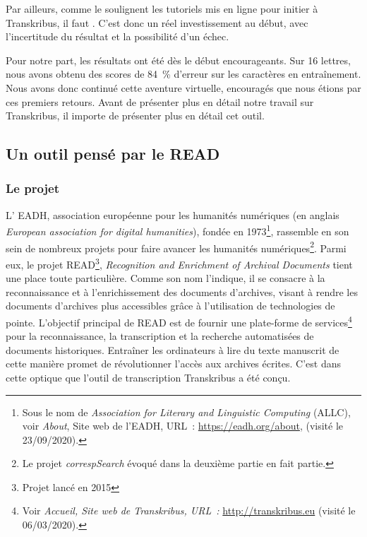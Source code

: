 Par ailleurs, comme le soulignent les tutoriels mis en ligne pour initier à Transkribus, il faut . C’est donc un réel investissement au début, avec l’incertitude du résultat et la possibilité d’un échec.

Pour notre part, les résultats ont été dès le début encourageants. Sur 16 lettres, nous avons obtenu des scores de 84~\% d'erreur sur les caractères en entraînement. 
Nous avons donc continué cette aventure virtuelle, encouragés que nous étions par ces premiers retours.
Avant de présenter plus en détail notre travail sur Transkribus, il importe de présenter plus en détail cet outil.

\subsection{Un outil pensé par le READ}

\subsubsection{Le projet}

L' EADH, association européenne pour les humanités numériques (en anglais \emph{European association for digital humanities}), fondée en 1973\footnote{Sous le nom de \emph{Association for Literary and Linguistic Computing} (ALLC), voir \emph{About}, Site web de l'EADH, URL~: \url{https://eadh.org/about}, (visité le 23/09/2020).}, rassemble en son sein de nombreux projets pour faire avancer les humanités numériques\footnote{Le projet \emph{correspSearch} évoqué dans la deuxième partie en fait partie.}. Parmi eux, le projet READ\footnote{Projet lancé en 2015}, \emph{Recognition and Enrichment of Archival Documents} tient une place toute particulière. Comme son nom l'indique, il se consacre à la reconnaissance et à l'enrichissement des documents d'archives, visant à rendre les documents d'archives plus accessibles grâce à l'utilisation de technologies de pointe. L'objectif principal de READ est de fournir une plate-forme de services\footnote{Voir \emph{Accueil, Site web de Transkribus, URL~: }\url{http://transkribus.eu} (visité le 06/03/2020).} pour la reconnaissance, la transcription et la recherche automatisées de documents historiques. Entraîner les ordinateurs à lire du texte manuscrit de cette manière promet de révolutionner l'accès aux archives écrites. C'est dans cette optique que l'outil de transcription Transkribus a été conçu.

